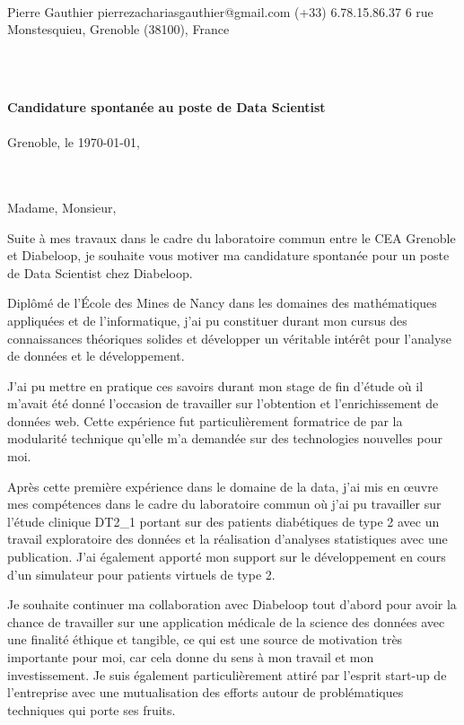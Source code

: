 \documentclass{cv_style}
\begin{document}
\vspace{3cm}\\
    {Pierre Gauthier}
    {{pierrezachariasgauthier@gmail.com}}
    {{(+33) 6.78.15.86.37}}
		{6 rue Monstesquieu, Grenoble (38100), France}


%
\vspace{2cm}\\
\begin{flushleft}
    \vspace{0.8cm} \\
    \large
    \textbf{Candidature spontanée au poste de Data Scientist  }   \\
    \vspace{0.7cm} \\
    Grenoble, le \today, \\
    \\[0.2cm]
    \vspace{0.5cm} \\
\end{flushleft}
\vspace{0.0cm}
\large

Madame, Monsieur,

Suite à mes travaux dans le cadre du laboratoire commun entre le CEA Grenoble et Diabeloop, je souhaite vous motiver ma candidature spontanée pour un poste de Data Scientist chez Diabeloop.

Diplômé de l'École des Mines de Nancy dans les domaines des mathématiques appliquées et de l'informatique, j'ai pu constituer durant mon cursus des connaissances théoriques solides et développer un véritable intérêt pour l'analyse de données et le développement. 

J'ai pu mettre en pratique ces savoirs durant mon stage de fin d'étude où il m'avait été donné l'occasion de travailler sur l'obtention et l'enrichissement de données web. Cette expérience fut particulièrement formatrice de par la modularité technique qu'elle m'a demandée sur des technologies nouvelles pour moi.

Après cette première expérience dans le domaine de la data, j'ai mis en œuvre mes compétences dans le cadre du laboratoire commun où j'ai pu travailler sur l'étude clinique DT2\_1 portant sur des patients diabétiques de type 2 avec un travail exploratoire des données et la réalisation d'analyses statistiques avec une publication. J'ai également apporté mon support sur le développement en cours d'un simulateur pour patients virtuels de type 2.

Je souhaite continuer ma collaboration avec Diabeloop tout d'abord pour avoir la chance de travailler sur une application médicale de la science des données avec une finalité éthique et tangible, ce qui est une source de motivation très importante pour moi, car cela donne du sens à mon travail et mon investissement. Je suis également particulièrement attiré par l'esprit start-up de l'entreprise avec une mutualisation des efforts autour de problématiques techniques qui porte ses fruits. 
\end{document}
